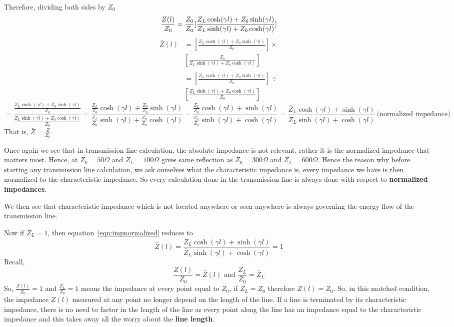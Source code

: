 Therefore, dividing both sides by $Z_0$
\begin{dmath}
\frac{Z(l)}{Z_0} = \frac{Z_0}{Z_0}[\frac{Z_L\cosh(\gamma l) + Z_0\sinh(\gamma l)}{Z_L\sinh(\gamma l) + Z_0\cosh(\gamma l)}]\\
\end{dmath}
\begin{align*}
\bar{Z}(l) &= \left[\frac{Z_L\cosh(\gamma l) + Z_0\sinh(\gamma l)}{Z_0}\right] \times \\ 
& \left[\frac{Z_0}{Z_L\sinh(\gamma l) + Z_0\cosh(\gamma l)}\right] \\\\
&= \left[\frac{Z_L\cosh(\gamma l) + Z_0\sinh(\gamma l)}{Z_0}\right] \div \\
& \left[\frac{Z_L\sinh(\gamma l) + Z_0\cosh(\gamma l)}{Z_0}\right]
\end{align*}
\begin{dmath}
= \frac{\frac{Z_L\cosh(\gamma l) + Z_0\sinh(\gamma l)}{Z_0}}{\frac{Z_L\sinh(\gamma l) + Z_0\cosh(\gamma l)}{Z_0}}
=\frac{\frac{Z_L}{Z_0}\cosh(\gamma l) + \frac{Z_0}{Z_0}\sinh(\gamma l)}{\frac{Z_L}{Z_0}\sinh(\gamma l) + \frac{Z_0}{Z_0}\cosh(\gamma l)}
= \frac{\frac{Z_L}{Z_0}\cosh(\gamma l) + \sinh(\gamma l)}{\frac{Z_L}{Z_0}\sinh(\gamma l) + \cosh(\gamma l)}
= \frac{\bar{Z}_L\cosh(\gamma l) + \sinh(\gamma l)}{\bar{Z}_L\sinh(\gamma l) + \cosh(\gamma l)}\ \text{(normalized impedance)}
\label{eqn:impnormalized}
\end{dmath}
That is, $\bar{Z} = \frac{Z}{Z_0}$.

Once again we see that in transmission line calculation, the absolute impedance is not relevant, rather it is the normalized impedance that matters most. Hence, at $Z_0 = 50\Omega$ and $Z_L = 100\Omega$ gives same reflection as $Z_0 = 300\Omega$ and $Z_L =600\Omega$. Hence the reason why before starting any transmission line calculation, we ask ourselves what the characteristic impedance is, every impedance we have is then normalized to the characteristic impedance. So every calculation done in the transmission line is always done with respect to \textbf{normalized impedances}.

We then see that characteristic impedance which is not located anywhere or seen anywhere is always governing the energy flow of the transmission line.

Now if $\bar{Z}_L = 1$, then equation~\eqref{eqn:impnormalized} reduces to
\begin{dmath*}
\bar{Z}(l) = {\frac{\bar{Z}_L\cosh(\gamma l) + \sinh(\gamma l)}{\bar{Z}_L\sinh(\gamma l) + \cosh(\gamma l)}} = 1
\end{dmath*}
Recall,
\[\frac{Z(l)}{Z_0} = \bar{Z}(l)\text{ and }\frac{Z_L}{Z_0} = \bar{Z}_L\]
So, $\frac{Z(l)}{Z_0} = 1$ and $\frac{Z_L}{Z_0} = 1$ means the impedance at every point equal to $Z_0$, if $Z_L = Z_0$ therefore $Z(l) = Z_0$. So, in this matched condition, the impedance $Z(l)$ measured at any point no longer depend on the length of the line. If a line is terminated by its characteristic impedance, there is no need to factor in the length of the line as every point along the line has an impedance equal to the characteristic impedance and this takes away all the worry about the \textbf{line length}.

